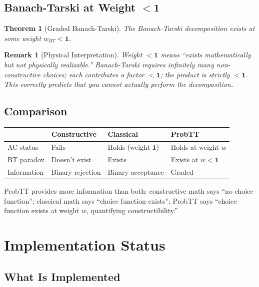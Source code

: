 \documentclass[11pt,a4paper]{article}
\newtheorem{remark}{Remark}[section]
\newtheorem{theorem}{Theorem}[section]
\newcommand{\one}{\mathbf{1}}
\begin{document}
\subsection{Banach-Tarski at Weight $< \one$}

\begin{theorem}[Graded Banach-Tarski]
The Banach-Tarski decomposition exists at some weight $w_{BT} < \one$.
\end{theorem}

\begin{remark}[Physical Interpretation]
Weight $< \one$ means ``exists mathematically but not physically realizable.'' Banach-Tarski requires infinitely many non-constructive choices; each contributes a factor $< \one$; the product is strictly $< \one$. This correctly predicts that you cannot actually perform the decomposition.
\end{remark}

\subsection{Comparison}

\begin{center}
\begin{tabular}{l|l|l|l}
& \textbf{Constructive} & \textbf{Classical} & \textbf{ProbTT} \\
\hline
AC status & Fails & Holds (weight $\one$) & Holds at weight $w$ \\
BT paradox & Doesn't exist & Exists & Exists at $w < \one$ \\
Information & Binary rejection & Binary acceptance & Graded \\
\end{tabular}
\end{center}

ProbTT provides more information than both: constructive math says ``no choice function''; classical math says ``choice function exists''; ProbTT says ``choice function exists at weight $w$, quantifying constructibility.''

\section{Implementation Status}

\subsection{What Is Implemented}
\end{document}

